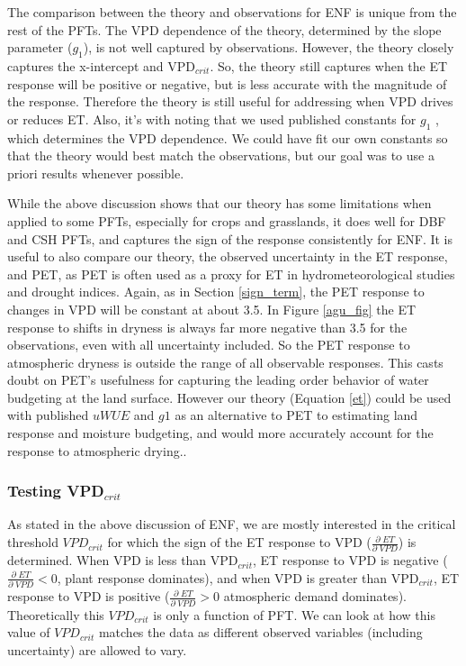 \documentclass[draft,linenumbers]{agujournal}
\begin{document}
The comparison between the theory and observations for ENF is unique from the rest of the PFTs. The VPD dependence of the theory, determined by the slope parameter ($g_1$), is not well captured by observations. However, the theory closely captures the x-intercept and VPD$_{crit}$. So, the theory still captures when the ET response will be positive or negative, but is less accurate with the magnitude of the response. Therefore the theory is still useful for addressing when VPD drives or reduces ET. Also, it's with noting that we used published constants for $g_1$ \citep[from ][]{Lin_2015}, which determines the VPD dependence. We could have fit our own constants so that the theory would best match the observations, but our goal was to use a priori results whenever possible.

While the above discussion shows that our theory has some limitations when applied to some PFTs, especially for crops and grasslands, it does well for DBF and CSH PFTs, and captures the sign of the response consistently for ENF. It is useful to also compare our theory, the observed uncertainty in the ET response, and PET, as PET is often used as a proxy for ET in hydrometeorological studies and drought indices.  Again, as in Section \ref{sign_term}, the PET response to changes in VPD will be constant at about 3.5. In Figure \ref{agu_fig} the ET response to shifts in dryness is always far more negative than 3.5 for the observations, even with all uncertainty included. So the PET response to atmospheric dryness is outside the range of all observable responses. This casts doubt on PET's usefulness for capturing the leading order behavior of water budgeting at the land surface. However our theory (Equation \ref{et}) could be used with published $uWUE$ and $g1$ as an alternative to PET to estimating land response and moisture budgeting, and would more accurately account for the response to atmospheric drying..

\subsubsection{Testing VPD$_{crit}$}
As stated in the above discussion of ENF, we are mostly interested in the critical threshold $VPD_{crit}$ for which the sign of the ET response to VPD ($\frac{\partial \; ET}{\partial \; VPD}$) is determined. When VPD is less than VPD$_{crit}$, ET response to VPD is negative ($\frac{\partial \; ET}{\partial \; VPD}  < 0$, plant response dominates), and when VPD is greater than VPD$_{crit}$, ET response to VPD is positive  ($\frac{\partial \; ET}{\partial \; VPD} > 0$ atmospheric demand dominates). Theoretically this $VPD_{crit}$ is only a function of PFT. We can look at how this value of $VPD_{crit}$ matches the data as different observed variables (including uncertainty) are allowed to vary.
\end{document}
